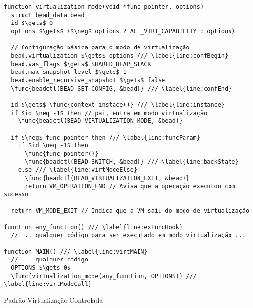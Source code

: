 \begin{pseudocode}
\begin{lstlisting}[language=pseudocode, style=pseudocode]
function virtualization_mode(void *func_pointer, options)
  struct bead_data bead
  id $\gets$ 0
  options $\gets$ ($\neg$ options ? ALL_VIRT_CAPABILITY : options)

  // Configuração básica para o modo de virtualização
  bead.virtualization $\gets$ options /// \label{line:confBegin}
  bead.vas_flags $\gets$ SHARED_HEAP_STACK
  bead.max_snapshot_level $\gets$ 1
  bead.enable_recursive_snapshot $\gets$ false
  \func{beadctl(BEAD_SET_CONFIG, &bead)} /// \label{line:confEnd}

  id $\gets$ \func{context_instace()} /// \label{line:instance}
  if $id \neq -1$ then // pai, entra em modo virtualização
    \func{beadctl(BEAD_VIRTUALIZATION_MODE, &bead)}

  if $\neg$ func_pointer then /// \label{line:funcParam}
    if $id \neq -1$ then
      \func{func_pointer()}
      \func{beadctl(BEAD_SWITCH, &bead)} /// \label{line:backState}
    else /// \label{line:virtModeElse}
      \func{beadctl(BEAD_VIRTUALIZATION_EXIT, &bead)}
      return VM_OPERATION_END // Avisa que a operação executou com sucesso

  return VM_MODE_EXIT // Indica que a VM saiu do modo de virtualização

function any_function() /// \label{line:exFuncHook}
  // ... qualquer código para ser executado em modo virtualização ...

function MAIN() /// \label{line:virtMAIN}
  // ... qualquer código ...
  OPTIONS $\gets 0$
  \func{virtualization_mode(any_function, OPTIONS)} /// \label{line:virtModeCall}

\end{lstlisting}

  \caption{Padrão Virtualização Controlada}
  \label{alg:virtMode}
\end{pseudocode}
